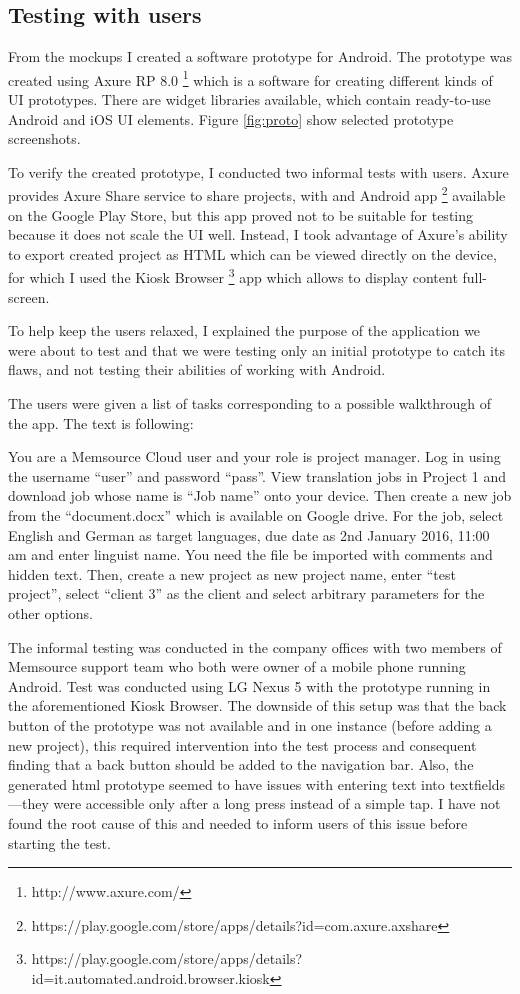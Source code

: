\subsection{Testing with users}

From the mockups I created a software prototype for Android. The prototype was created using Axure RP 8.0 \footnote{http://www.axure.com/} which is a software for creating different kinds of UI prototypes. There are widget libraries available, which contain ready-to-use Android and iOS UI elements. Figure \ref{fig:proto} show selected prototype screenshots.

To verify the created prototype, I conducted two informal tests with users. Axure provides Axure Share service to share projects, with and Android app \footnote{https://play.google.com/store/apps/details?id=com.axure.axshare} available on the Google Play Store, but this app proved not to be suitable for testing because it does not scale the UI well. Instead, I took advantage of Axure's ability to export created project as HTML which can be viewed directly on the device, for which I used the Kiosk Browser \footnote{https://play.google.com/store/apps/details?id=it.automated.android.browser.kiosk} app which allows to display content full-screen. 

To help keep the users relaxed, I explained the purpose of the application we were about to test and that we were testing only an initial prototype to catch its flaws, and not testing their abilities of working with Android.

The users were given a list of tasks corresponding to a possible walkthrough of the app. The text is following: 

You are a Memsource Cloud user and your role is project manager. Log in using the username ``user'' and password ``pass''. View translation jobs in Project 1 and download job whose name is ``Job name'' onto your device. Then create a new job from the ``document.docx'' which is available on Google drive. For the job, select English and German as target languages, due date as 2nd January 2016, 11:00 am and enter linguist name. You need the file be imported with comments and hidden text. Then, create a new project as new project name, enter ``test project'', select ``client 3'' as the client and select arbitrary parameters for the other options.

The informal testing was conducted in the company offices with two members of Memsource support team who both were owner of a mobile phone running Android. Test was conducted using LG Nexus 5 with the prototype running in the aforementioned Kiosk Browser. The downside of this setup was that the back button of the prototype was not available and in one instance (before adding a new project), this required intervention into the test process and consequent finding that a back button should be added to the navigation bar. Also, the generated html prototype seemed to have issues with entering text into textfields---they were accessible only after a long press instead of a simple tap. I have not found the root cause of this and needed to inform users of this issue before starting the test.

